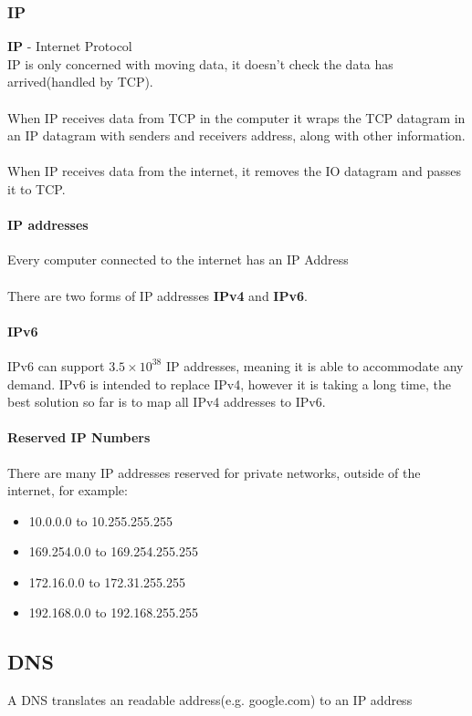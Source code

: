 \documentclass{article}[18pt]
\begin{document}
\subsubsection{IP}
\textbf{IP} - Internet Protocol\\
IP is only concerned with moving data, it doesn't check the data has arrived(handled by TCP).\\
\\
When IP receives data from TCP in the computer it wraps the TCP datagram in an IP datagram with senders and receivers address, along with other information.\\
\\
When IP receives data from the internet, it removes the IO datagram and passes it to TCP.
\paragraph{IP addresses}
Every computer connected to the internet has an IP Address\\
\\
There are two forms of IP addresses \textbf{IPv4} and \textbf{IPv6}.
\paragraph{IPv6}
IPv6 can support $3.5\times10^{38}$ IP addresses, meaning it is able to accommodate any demand. IPv6 is intended to replace IPv4, however it is taking a long time, the best solution so far is to map all IPv4 addresses to IPv6.
\paragraph{Reserved IP Numbers}
There are many IP addresses reserved for private networks, outside of the internet, for example:
\begin{itemize}
\item 10.0.0.0 to 10.255.255.255
\item 169.254.0.0 to 169.254.255.255
\item 172.16.0.0 to 172.31.255.255
\item 192.168.0.0 to 192.168.255.255
\end{itemize}
\subsection{DNS}
A DNS translates an readable address(e.g. google.com) to an IP address
\end{document}
